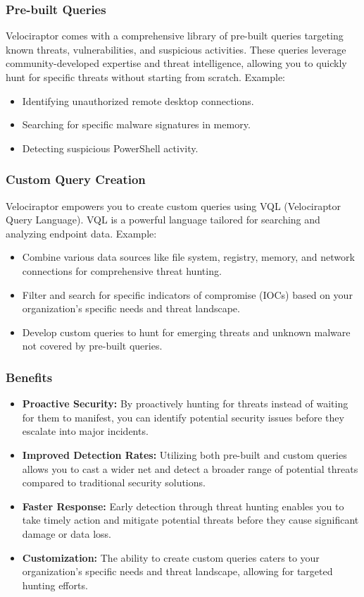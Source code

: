 \documentclass[a4paper, 11pt, oneside]{article} %
\begin{document}
\subsubsection{Pre-built Queries}
Velociraptor comes with a comprehensive library of pre-built queries targeting known threats, vulnerabilities, and suspicious activities. These queries leverage community-developed expertise and threat intelligence, allowing you to quickly hunt for specific threats without starting from scratch.
Example:
\begin{itemize}
    \item Identifying unauthorized remote desktop connections.
    \item Searching for specific malware signatures in memory.
    \item Detecting suspicious PowerShell activity.
\end{itemize}
\subsubsection{Custom Query Creation}
Velociraptor empowers you to create custom queries using VQL (Velociraptor Query Language). VQL is a powerful language tailored for searching and analyzing endpoint data.
Example:
\begin{itemize}
    \item Combine various data sources like file system, registry, memory, and network connections for comprehensive threat hunting.
    \item Filter and search for specific indicators of compromise (IOCs) based on your organization's specific needs and threat landscape.
    \item Develop custom queries to hunt for emerging threats and unknown malware not covered by pre-built queries.
\end{itemize}
\subsubsection{Benefits}
\begin{itemize}
    \item \textbf{Proactive Security: }By proactively hunting for threats instead of waiting for them to manifest, you can identify potential security issues before they escalate into major incidents.
    \item \textbf{Improved Detection Rates: } Utilizing both pre-built and custom queries allows you to cast a wider net and detect a broader range of potential threats compared to traditional security solutions.
    \item \textbf{Faster Response: }Early detection through threat hunting enables you to take timely action and mitigate potential threats before they cause significant damage or data loss.
    \item \textbf{Customization: }The ability to create custom queries caters to your organization's specific needs and threat landscape, allowing for targeted hunting efforts.
\end{itemize}
\end{document}
